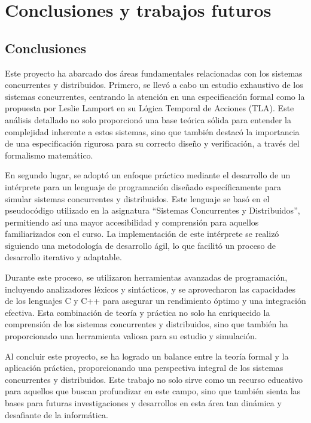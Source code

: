 \chapter{\textbf{Conclusiones y trabajos futuros}}

\section{Conclusiones}
Este proyecto ha abarcado dos áreas fundamentales relacionadas con los sistemas concurrentes y distribuidos. Primero, se llevó a cabo un estudio exhaustivo de los sistemas concurrentes, centrando la atención en una especificación formal como la propuesta por Leslie Lamport en su Lógica Temporal de Acciones (TLA). Este análisis detallado no solo proporcionó una base teórica sólida para entender la complejidad inherente a estos sistemas, sino que también destacó la importancia de una especificación rigurosa para su correcto diseño y verificación, a través del formalismo matemático.

En segundo lugar, se adoptó un enfoque práctico mediante el desarrollo de un intérprete para un lenguaje de programación diseñado específicamente para simular sistemas concurrentes y distribuidos. Este lenguaje se basó en el pseudocódigo utilizado en la asignatura ``Sistemas Concurrentes y Distribuidos'', permitiendo así una mayor accesibilidad y comprensión para aquellos familiarizados con el curso. La implementación de este intérprete se realizó siguiendo una metodología de desarrollo ágil, lo que facilitó un proceso de desarrollo iterativo y adaptable.

Durante este proceso, se utilizaron herramientas avanzadas de programación, incluyendo analizadores léxicos y sintácticos, y se aprovecharon las capacidades de los lenguajes C y C++ para asegurar un rendimiento óptimo y una integración efectiva. Esta combinación de teoría y práctica no solo ha enriquecido la comprensión de los sistemas concurrentes y distribuidos, sino que también ha proporcionado una herramienta valiosa para su estudio y simulación.

Al concluir este proyecto, se ha logrado un balance entre la teoría formal y la aplicación práctica, proporcionando una perspectiva integral de los sistemas concurrentes y distribuidos. Este trabajo no solo sirve como un recurso educativo para aquellos que buscan profundizar en este campo, sino que también sienta las bases para futuras investigaciones y desarrollos en esta área tan dinámica y desafiante de la informática.


